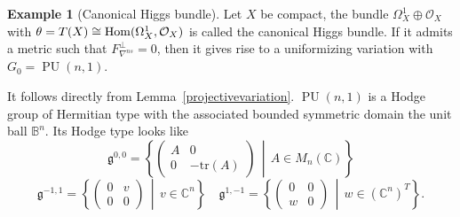 \documentclass[aspectratio=169, 10pt]{beamer}
\theoremstyle{definition}
\theoremstyle{example}
\newtheorem{Ex}{Example}
\begin{document}
	\begin{frame}[allowframebreaks]
		\begin{Ex}[Canonical Higgs bundle]\label{ex2}
			Let $X$ be compact, the bundle $\Omega_X^1\oplus \mathcal{O}_X$ with $\theta=T(X)\cong \operatorname{Hom}(\Omega_X^1, \mathcal{O}_X)$ is called the canonical Higgs bundle. If it admits a metric such that $F_{\nabla^{ns}}^{\perp}=0$, then it gives rise to a uniformizing variation with $G_0=\operatorname{PU}(n,1)$.
		\end{Ex}
		It follows directly from Lemma~\ref{projectivevariation}. $\operatorname{PU}(n,1)$ is a Hodge group of Hermitian type with the associated bounded symmetric domain the unit ball $\mathbb{B}^n$. Its Hodge type looks like
		\[
			\mathfrak g^{0,0}
			=
			\left\{
			\begin{pmatrix}
			A & 0 \\
			0 & -\mathrm{tr}(A)
			\end{pmatrix}
			\,\middle|\,
			A\in M_n(\mathbb C)
			\right\}
		\]
		\[	
		\mathfrak g^{-1,1}
			=
			\left\{
			\begin{pmatrix}
			0 & v \\
			0 & 0
			\end{pmatrix}
			\,\middle|\,
			v\in\mathbb C^{n}
			\right\}\quad
			\mathfrak g^{1,-1}
			=
			\left\{
			\begin{pmatrix}
			0 & 0 \\
			w & 0
			\end{pmatrix}
			\,\middle|\,
			w\in(\mathbb C^{n})^{T}
			\right\}.
			\]
	\end{frame}
\end{document}

